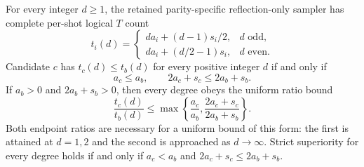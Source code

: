 \begin{theorem}
\label{thm:representation-sampler-dominance}
For every integer $d\geq1$, the retained parity-specific reflection-only
sampler has complete per-shot logical $T$ count
\begin{equation}
 t_i(d)=
 \begin{cases}
   da_i+(d-1)s_i/2,&d\text{ odd},\\
   da_i+(d/2-1)s_i,&d\text{ even}.
 \end{cases}
 \label{eq:representation-parity-cost}
\end{equation}
Candidate $c$ has $t_c(d)\leq t_b(d)$ for every positive integer $d$
if and only if
\begin{equation}
 a_c\leq a_b,\qquad 2a_c+s_c\leq2a_b+s_b.
 \label{eq:representation-all-degree-condition}
\end{equation}
If $a_b>0$ and $2a_b+s_b>0$, then every degree obeys the uniform ratio
bound
\begin{equation}
 \frac{t_c(d)}{t_b(d)}\leq
 \max\left\{\frac{a_c}{a_b},
             \frac{2a_c+s_c}{2a_b+s_b}\right\}.
 \label{eq:representation-all-degree-ratio}
\end{equation}
Both endpoint ratios are necessary for a uniform bound of this form:
the first is attained at $d=1,2$ and the second is approached as
$d\longrightarrow\infty$. Strict superiority for every degree holds
if and only if $a_c<a_b$ and $2a_c+s_c\leq2a_b+s_b$.
\end{theorem}

